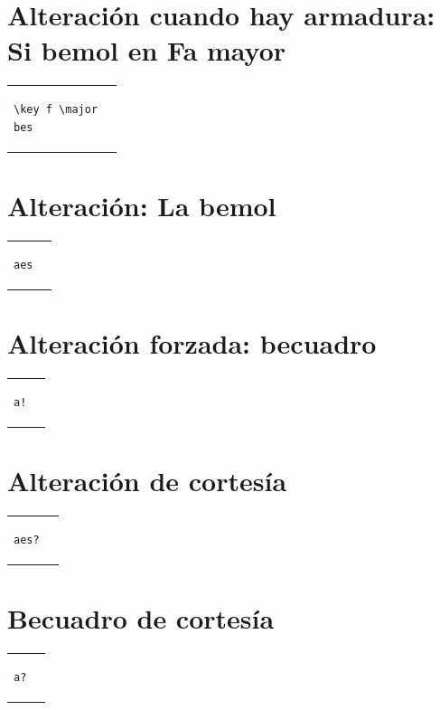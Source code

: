 \documentclass[10pt,a4paper,oneside,headinclude,titlepage]{scrartcl}
\begin{document}
\section*{Alteración cuando hay armadura: Si bemol en Fa mayor}
\begin{tabular}{m{2cm}m{2cm}}
\begin{verbatim}
\key f \major
bes
\end{verbatim}
&
\begin[fragment,relative=2,notime]{lilypond}
    \key f \major
    bes
\end{lilypond}
\end{tabular}

\section*{Alteración: La bemol}
\begin{tabular}{m{2cm}m{2cm}}
\begin{verbatim}
aes
\end{verbatim}
&
\begin[fragment,relative=2,notime]{lilypond}
aes
\end{lilypond}
\end{tabular}

\section*{Alteración forzada: becuadro}
\begin{tabular}{m{2cm}m{2cm}}
\begin{verbatim}
a!
\end{verbatim}
&
\begin[fragment,relative=2,notime]{lilypond}
a!
\end{lilypond}
\end{tabular}

\section*{Alteración de cortesía}
\begin{tabular}{m{2cm}m{2cm}}
\begin{verbatim}
aes?
\end{verbatim}
&
\begin[fragment,relative=2,notime]{lilypond}
aes?
\end{lilypond}
\end{tabular}

\section*{Becuadro de cortesía}
\begin{tabular}{m{2cm}m{2cm}}
\begin{verbatim}
a?
\end{verbatim}
&
\begin[fragment,relative=2,notime]{lilypond}
a?
\end{lilypond}
\end{tabular}
\end{document}
